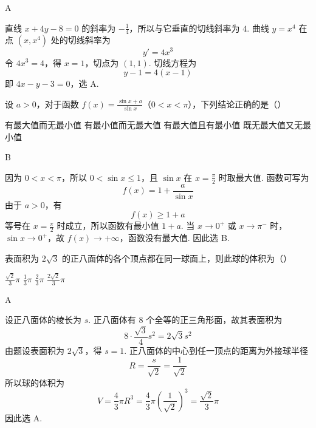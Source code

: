 \begin{answer}
A
\end{answer}

\begin{solution}
直线 \(x+4y-8=0\) 的斜率为 \(-\frac{1}{4}\)，所以与它垂直的切线斜率为 \(4\). 曲线 \(y=x^4\) 在点 \((x,x^4)\) 处的切线斜率为
\[
y'=4x^3
\]
令 \(4x^3=4\)，得 \(x=1\)，切点为 \((1,1)\). 切线方程为
\[
y-1=4(x-1)
\]
即 \(4x-y-3=0\)，选 A.
\end{solution}

\begin{problem}
设 \(a > 0\)，对于函数 \(f(x) = \frac{\sin x + a}{\sin x}\)（\(0 < x < \pi\)），下列结论正确的是（\quad）

\choices
    {有最大值而无最小值}
    {有最小值而无最大值}
    {有最大值且有最小值}
    {既无最大值又无最小值}
\end{problem}

\begin{answer}
B
\end{answer}

\begin{solution}
因为 \(0<x<\pi\)，所以 \(0<\sin x\leqslant1\)，且 \(\sin x\) 在 \(x=\frac{\pi}{2}\) 时取最大值. 函数可写为
\[
f(x)=1+\frac{a}{\sin x}
\]
由于 \(a>0\)，有
\[
f(x)\geqslant1+a
\]
等号在 \(x=\frac{\pi}{2}\) 时成立，所以函数有最小值 \(1+a\). 当 \(x\to0^+\) 或 \(x\to\pi^-\) 时，\(\sin x\to0^+\)，故 \(f(x)\to+\infty\)，函数没有最大值. 因此选 B.
\end{solution}

\begin{problem}
表面积为 \(2\sqrt{3}\) 的正八面体的各个顶点都在同一球面上，则此球的体积为（\quad）

\choices
    {\(\frac{\sqrt{2}}{3}\pi\)}
    {\(\frac{1}{3}\pi\)}
    {\(\frac{2}{3}\pi\)}
    {\(\frac{2\sqrt{2}}{3}\pi\)}
\end{problem}

\begin{answer}
A
\end{answer}

\begin{solution}
设正八面体的棱长为 \(s\). 正八面体有 \(8\) 个全等的正三角形面，故其表面积为
\[
8\cdot\frac{\sqrt{3}}{4}s^2=2\sqrt{3}s^2
\]
由题设表面积为 \(2\sqrt{3}\)，得 \(s=1\). 正八面体的中心到任一顶点的距离为外接球半径
\[
R=\frac{s}{\sqrt{2}}=\frac{1}{\sqrt{2}}
\]
所以球的体积为
\[
V=\frac{4}{3}\pi R^3=\frac{4}{3}\pi\left(\frac{1}{\sqrt{2}}\right)^3=\frac{\sqrt{2}}{3}\pi
\]
因此选 A.
\end{solution}

